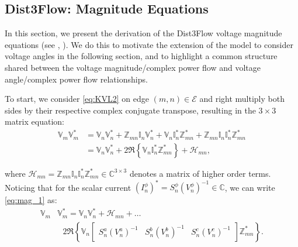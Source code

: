 \subsection{Dist3Flow: Magnitude Equations}
\label{subsec:magnitude}

In this section, we present the derivation of the Dist3Flow voltage magnitude equations (see \cite{arnold2015model}, \cite{sankur2016linear}).  We do this to motivate the extension of the model to consider voltage angles in the following section, and to highlight a common structure shared between the voltage magnitude/complex power flow and voltage angle/complex power flow relationships. 

To start, we consider \eqref{eq:KVL2} on edge $(m,n) \in \mathcal{E}$ and right multiply both sides by their respective complex conjugate transpose, resulting in the $3 \times 3$ matrix equation:
\begin{align}
	\mathbb{V}_{m} \mathbb{V}_{m}^*  & =  \mathbb{V}_{n} \mathbb{V}_{n}^* + \mathbb{Z}_{mn} \mathbb{I}_{n} \mathbb{V}_{n}^* + \mathbb{V}_{n} \mathbb{I}_{n}^{*} \mathbb{Z}_{mn}^{*} + \mathbb{Z}_{mn} \mathbb{I}_{n} \mathbb{I}_{n}^{*} \mathbb{Z}_{mn}^{*} \nonumber \\
    & = \mathbb{V}_{n} \mathbb{V}_{n}^* + 2 \Re \left\{\mathbb{V}_{n} \mathbb{I}_{n}^{*} \mathbb{Z}_{mn}^{*} \right\} + \mathcal H_{mn},
\label{eq:mag_1}
\end{align}

\noindent where $\mathcal H_{mn} = \mathbb{Z}_{mn} \mathbb{I}_{n} \mathbb{I}_{n}^{*} \mathbb{Z}_{mn}^{*} \in \mathbb C^{3 \times 3}$ denotes a matrix of higher order terms.  Noticing that for the scalar current ${\left( I^{\phi}_{n} \right)}^{*} = S_{n}^{\phi} {\left( V_{n}^{\phi} \right)}^{-1} \in \mathbb{C}$,  we can write \eqref{eq:mag_1} as:
\begin{equation}
	\begin{aligned}
		\mathbb{V}_{m} & \mathbb{V}_{m}^{*} = \mathbb{V}_{n} \mathbb{V}_{n}^{*} + \mathcal H_{mn} + \ldots \\
    	& \text{ } 2 \Re \left\{ \mathbb{V}_{n}
    	\begin{bmatrix}
    		S_{n}^{a} {\left( V_{n}^{a} \right)}^{-1} & S_{n}^{b} {\left( V_{n}^{b} \right)}^{-1} & S_{n}^{c} {\left( V_{n}^{c} \right)}^{-1}
    	\end{bmatrix}
    	\mathbb{Z}_{mn}^{*} \right\}.
    \end{aligned}
    \label{eq:mag_2}
\end{equation}

